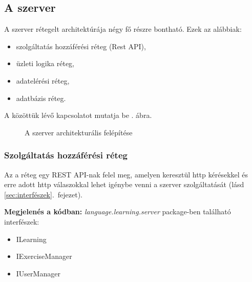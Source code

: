 \documentclass[11pt, a4paper]{article}
\begin{document}
    \subsection{A szerver}
    A szerver rétegelt architektúrája négy fő részre bontható. Ezek az alábbiak:
    \begin{itemize}
    	\item szolgáltatás hozzáférési réteg (Rest API),
    	\item üzleti logika réteg,
    	\item adatelérési réteg,
    	\item adatbázis réteg.
    \end{itemize}
    A közöttük lévő kapcsolatot mutatja be . ábra.
    
    \begin{figure}[htbp]
    	\center
    	\caption{A szerver architekturális felépítése}
    	\label{fig:server_arch}
    \end{figure}
    
    \subsubsection{Szolgáltatás hozzáférési réteg}
    Az a réteg egy REST API-nak felel meg, amelyen keresztül http kérésekkel és erre adott http válaszokkal lehet igénybe venni a szerver szolgáltatását (lásd \ref{sec:interfészek}.~fejezet).
    
    \textbf{Megjelenés a kódban:} \textit{language.learning.server} package-ben található interfészek: 
    \begin{itemize}
    	\item ILearning
    	\item IExerciseManager
    	\item IUserManager
    \end{itemize}
    
\end{document}
